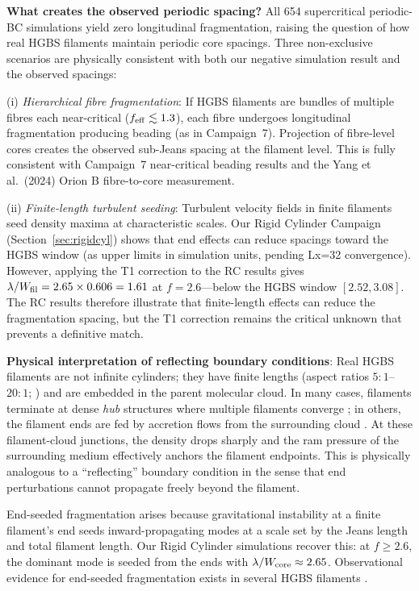 \documentclass[twoside,twocolumn]{mnras}
\begin{document}
\textbf{What creates the observed periodic spacing?} All 654 supercritical periodic-BC
simulations yield zero longitudinal fragmentation, raising the question of how real HGBS
filaments maintain periodic core spacings. Three non-exclusive scenarios are physically
consistent with both our negative simulation result and the observed spacings:

(i) \textit{Hierarchical fibre fragmentation}: If HGBS filaments are bundles of multiple
fibres each near-critical ($f_{\rm eff} \lesssim 1.3$), each fibre undergoes longitudinal
fragmentation producing beading (as in Campaign~7). Projection of fibre-level cores creates
the observed sub-Jeans spacing at the filament level. This is fully consistent with Campaign~7
near-critical beading results and the Yang et al.\ (2024) Orion B fibre-to-core measurement.

(ii) \textit{Finite-length turbulent seeding}: Turbulent velocity fields in finite
filaments seed density maxima at characteristic scales. Our Rigid Cylinder Campaign
(Section~\ref{sec:rigidcyl}) shows that end effects can reduce spacings toward the HGBS window (as upper limits in simulation units, pending Lx=32 convergence). However, applying the T1 correction to the
RC results gives $\lambda/W_{\rm fil} = 2.65 \times 0.606 = 1.61$ at $f = 2.6$---below
the HGBS window $[2.52, 3.08]$. The RC results therefore illustrate that finite-length
effects can reduce the fragmentation spacing, but the T1 correction remains the critical
unknown that prevents a definitive match.

\textbf{Physical interpretation of reflecting boundary conditions}: Real HGBS filaments
are not infinite cylinders; they have finite lengths (aspect ratios $5:1$--$20:1$;
\citealt{Arzoumanian2019}) and are embedded in the parent molecular cloud. In many cases,
filaments terminate at dense \textit{hub} structures where multiple filaments converge
\citep{Andre2010}; in others, the filament ends are fed by accretion flows from the
surrounding cloud \citep{Inutsuka1997, Pineda2023}. At these filament-cloud junctions,
the density drops sharply and the ram pressure of the surrounding medium effectively
anchors the filament endpoints. This is physically analogous to a ``reflecting'' boundary
condition in the sense that end perturbations cannot propagate freely beyond the
filament.

End-seeded fragmentation arises because gravitational instability at a finite filament's end seeds inward-propagating modes at a scale set by the Jeans length and total filament length. Our Rigid Cylinder simulations recover this: at $f \geq 2.6$, the dominant mode is seeded from the ends with $\lambda/W_{\rm core} \approx 2.65$. Observational evidence for end-seeded fragmentation exists in several HGBS filaments \citep{Pineda2023, Andre2010}.
\end{document}

